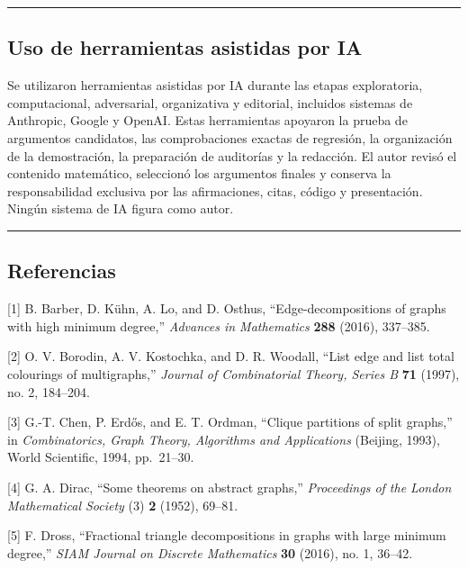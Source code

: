 \documentclass[
  11pt,
]{article}
\begin{document}
\begin{center}\rule{0.5\linewidth}{0.5pt}\end{center}

\subsection{Uso de herramientas asistidas por
IA}\label{uso-de-herramientas-asistidas-por-ia}

Se utilizaron herramientas asistidas por IA durante las etapas
exploratoria, computacional, adversarial, organizativa y editorial,
incluidos sistemas de Anthropic, Google y OpenAI. Estas herramientas
apoyaron la prueba de argumentos candidatos, las comprobaciones exactas
de regresión, la organización de la demostración, la preparación de
auditorías y la redacción. El autor revisó el contenido matemático,
seleccionó los argumentos finales y conserva la responsabilidad
exclusiva por las afirmaciones, citas, código y presentación. Ningún
sistema de IA figura como autor.

\begin{center}\rule{0.5\linewidth}{0.5pt}\end{center}

\subsection{Referencias}\label{referencias}

{[}1{]} B. Barber, D. Kühn, A. Lo, and D. Osthus, ``Edge-decompositions
of graphs with high minimum degree,'' \emph{Advances in Mathematics}
\textbf{288} (2016), 337--385.

{[}2{]} O. V. Borodin, A. V. Kostochka, and D. R. Woodall, ``List edge
and list total colourings of multigraphs,'' \emph{Journal of
Combinatorial Theory, Series B} \textbf{71} (1997), no. 2, 184--204.

{[}3{]} G.-T. Chen, P. Erdős, and E. T. Ordman, ``Clique partitions of
split graphs,'' in \emph{Combinatorics, Graph Theory, Algorithms and
Applications} (Beijing, 1993), World Scientific, 1994, pp.~21--30.

{[}4{]} G. A. Dirac, ``Some theorems on abstract graphs,''
\emph{Proceedings of the London Mathematical Society} (3) \textbf{2}
(1952), 69--81.

{[}5{]} F. Dross, ``Fractional triangle decompositions in graphs with
large minimum degree,'' \emph{SIAM Journal on Discrete Mathematics}
\textbf{30} (2016), no. 1, 36--42.
\end{document}

